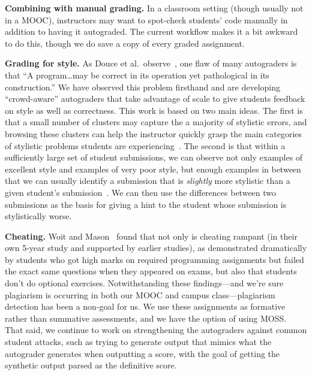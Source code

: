\textbf{Combining with manual grading.}  In a classroom setting (though
usually not in a MOOC), instructors may want to
spot-check students' code manually  in addition to having it
autograded.  The current workflow makes it a  bit awkward to do this,
though we do save a copy of every graded assignment.

\textbf{Grading for style.}
As Douce et al.\ observe~\cite{douce-2005-autograding-survey}, one flaw
of many autograders is that ``A program\ldots{}may be correct in its
operation yet pathological in its construction.''
We have observed this problem firsthand and are developing
``crowd-aware'' 
autograders that take advantage of
scale to give students feedback on style as well as correctness.
This work is based
on two main ideas.
The first is that a small number of clusters may capture the
a majority of stylistic errors, and browsing these clusters can help 
the instructor quickly grasp the main categories of stylistic problems students
are experiencing~\cite{clustering-style}.  The second is that within a sufficiently large set of
student submissions, we can observe not only examples of excellent style and
examples of very poor style, but enough examples in between that we can
usually identify a submission that is \emph{slightly} more stylistic
than a given student's submission~\cite{autostyle}.  We can then use the differences
between two submissions as the basis for giving a hint to the student
whose submission is stylistically worse.

\textbf{Cheating.}
Woit and Mason~\cite{woit2003} found that not only is cheating rampant
(in their own 5-year study and supported by earlier studies), as
demonstrated dramatically by students who got high marks on required
programming assignments but failed the exact same questions when they
appeared on exams, but also that students don't do optional exercises.
Notwithstanding these findings---and we're sure plagiarism is occurring
in both our MOOC and campus class---plagiarism detection has been a
non-goal for us.
We use these assignments as formative rather than summative assessments,
and we have the option of using
MOSS.
That said, we continue to work on strengthening the autograders against
common student attacks, such as trying to generate output that mimics
what the autograder generates when outputting a score, with the goal of
getting the synthetic output parsed as the definitive score.




